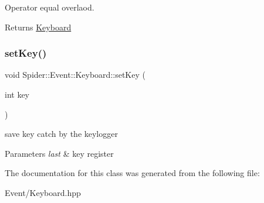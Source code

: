 Operator equal overlaod. 

\begin{DoxyReturn}{Returns}
\hyperlink{class_spider_1_1_event_1_1_keyboard}{Keyboard} 
\end{DoxyReturn}
\mbox{\label{class_spider_1_1_event_1_1_keyboard_adde706a751b1df210bb459dcc33c05a8}} 
\subsubsection{\texorpdfstring{set\+Key()}{setKey()}}
{\footnotesize\ttfamily void Spider\+::\+Event\+::\+Keyboard\+::set\+Key (\begin{DoxyParamCaption}\item[{int}]{key }\end{DoxyParamCaption})}



save key catch by the keylogger 


\begin{DoxyParams}{Parameters}
{\em last} & key register \\
\hline
\end{DoxyParams}


The documentation for this class was generated from the following file\+:\begin{DoxyCompactItemize}
\item 
Event/Keyboard.\+hpp\end{DoxyCompactItemize}
